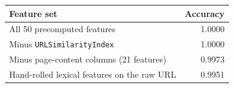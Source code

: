 \begin{tabular}{lr}
\toprule
Feature set & Accuracy \\
\midrule
All 50 precomputed features & 1.0000 \\
Minus \texttt{URLSimilarityIndex} & 1.0000 \\
Minus page-content columns (21 features) & 0.9973 \\
Hand-rolled lexical features on the raw URL & 0.9951 \\
\bottomrule
\end{tabular}
